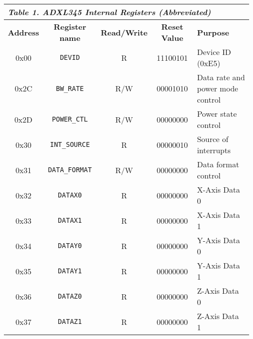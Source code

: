 \begin{table}[h]

    \centering
    \begin{tabular}{|c|c|c|c|p{7cm}|}
        \hline
        \multicolumn{5}{|l|}{\textit{\textbf{Table 1. ADXL345 Internal Registers (Abbreviated)}}}
        \\\hline
            \textbf{Address}
            & \textbf{Register name}
            & \textbf{Read/Write}
            & \textbf{Reset Value}
            & \textbf{Purpose}
        \\\hline
            0x00
            & \texttt{DEVID}
            & R
            & 11100101
            & Device ID (0xE5)
        \\\hline
            0x2C
            & \texttt{BW\_RATE}
            & R/W
            & 00001010
            & Data rate and power mode control
        \\\hline
            0x2D
            & \texttt{POWER\_CTL}
            & R/W
            & 00000000
            & Power state control
        \\\hline
            0x30
            & \texttt{INT\_SOURCE}
            & R
            & 00000010
            & Source of interrupts
        \\\hline
            0x31
            & \texttt{DATA\_FORMAT}
            & R/W
            & 00000000
            & Data format control
        \\\hline
            0x32
            & \texttt{DATAX0}
            & R
            & 00000000
            & X-Axis Data 0
        \\\hline
            0x33
            & \texttt{DATAX1}
            & R
            & 00000000
            & X-Axis Data 1
        \\\hline
            0x34
            & \texttt{DATAY0}
            & R
            & 00000000
            & Y-Axis Data 0
        \\\hline
            0x35
            & \texttt{DATAY1}
            & R
            & 00000000
            & Y-Axis Data 1
        \\\hline
            0x36
            & \texttt{DATAZ0}
            & R
            & 00000000
            & Z-Axis Data 0
        \\\hline
            0x37
            & \texttt{DATAZ1}
            & R
            & 00000000
            & Z-Axis Data 1
        \\\hline
    \end{tabular}
    \label{tab:adxl345regtable}
\end{table}
